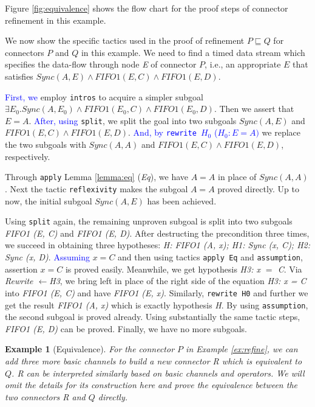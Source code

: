 \documentclass[preprint,3p]{elsarticle}
\newcommand{\liyi}[1]{\textcolor{blue}{#1}}
\newtheorem{example}{Example}[section]
\begin{document}
Figure \ref{fig:equivalence} shows the flow chart for the proof steps of
connector refinement in this example.


We now show the specific tactics used in the proof of refinement
$P \sqsubseteq Q$ for connectors $P$ and $Q$
in this example.
We need to find a timed data stream which specifies the data-flow through node \emph{E} of connector $P$, i.e., an appropriate \emph{$E$} that satisfies $Sync(A,E)\wedge FIFO1(E,C) \wedge FIFO1(E,D)$.

\liyi{First, we} employ \texttt{intros} to acquire a simpler subgoal $\exists E_{0}. Sync(A,E_{0})
\wedge FIFO1(E_{0},C) \wedge FIFO1(E_{0},D)$. Then we assert that $E=A$.
\liyi{After, using} \texttt{split}, we split the goal into two subgoals $Sync (A, E)$ and $FIFO1 (E, C) \wedge FIFO1 (E, D)$. \liyi{And, by \texttt{rewrite $H_{0}$} ($H_{0}: E = A)$} we replace the two subgoals with $Sync (A, A)$ and $FIFO1 (E, C) \wedge FIFO1 (E, D)$, respectively.

Through \texttt{apply} Lemma \ref{lemma:eq} (\emph{Eq}), we have $A = A$ in place of $Sync (A, A)$. Next the tactic \texttt{reflexivity} makes the subgoal $A = A$ proved directly. Up to now, the initial subgoal $Sync (A, E)$ has been achieved.

Using \texttt{split} again, the remaining unproven subgoal is split into two subgoals \emph{FIFO1 (E, C)} and \emph {FIFO1 (E, D)}.
After destructing the precondition three times, we succeed in obtaining three hypotheses: \emph{ H: FIFO1 (A, x); H1: Sync (x, C); H2: Sync (x, D)}. \liyi{Assuming} $x = C$ and then using tactics \texttt{apply Eq} and \texttt{assumption}, assertion $x = C$ is proved easily. Meanwhile, we get hypothesis \emph{H3: x $=$ C}. Via \emph{Rewrite $\leftarrow$H3}, we bring left in place of the right side of the equation \emph{H3: x = C} into \emph{FIFO1 (E, C)} and have \emph{FIFO1 (E, x)}. Similarly, \texttt{rewrite H0} and further we get the result \emph{FIFO1 (A, x)} which is exactly hypothesis \emph{H}. By using \texttt{assumption}, the second subgoal is proved already.
Using substantially the same tactic steps, \emph{FIFO1 (E, D)} can be proved. Finally, we have no more subgoals. %



\begin{example}[Equivalence]
For the connector $P$ in Example \ref{ex:refine}, we can add three more basic channels to build a new connector \emph{R} which is equivalent to $Q$. \emph{R} can be interpreted similarly based on basic channels and operators. We will omit the details for its construction here and prove the equivalence between the two connectors \emph{R} and $Q$ directly.
\end{example}
\end{document}
